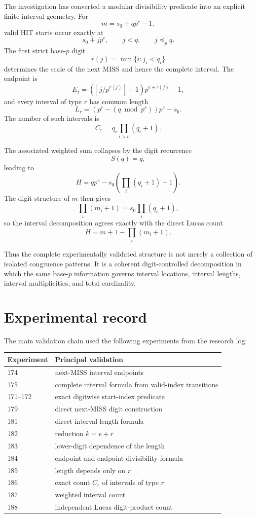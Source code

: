 \documentclass[11pt,a4paper]{article}
\theoremstyle{definition}
\theoremstyle{remark}
\newcommand{\floor}[1]{\left\lfloor #1\right\rfloor}
\begin{document}
The investigation has converted a modular divisibility predicate into an explicit finite interval geometry. For
\[
 m=s_0+qp^e-1,
\]
valid HIT starts occur exactly at
\[
 s_0+jp^e,
\qquad j<q,
\qquad j\preceq_p q.
\]
The first strict base-$p$ digit
\[
 r(j)=\min\{i:j_i<q_i\}
\]
determines the scale of the next MISS and hence the complete interval. The endpoint is
\[
 E_j=
 \left(\floor{j/p^{r(j)}}+1\right)p^{e+r(j)}-1,
\]
and every interval of type $r$ has common length
\[
 L_r=\left(p^r-(q\bmod p^r)\right)p^e-s_0.
\]
The number of such intervals is
\[
 C_r=q_r\prod_{i>r}(q_i+1).
\]

The associated weighted sum collapses by the digit recurrence
\[
 S(q)=q,
\]
leading to
\[
 H=qp^e-s_0\left(\prod_i(q_i+1)-1\right).
\]
The digit structure of $m$ then gives
\[
 \prod_i(m_i+1)=s_0\prod_i(q_i+1),
\]
so the interval decomposition agrees exactly with the direct Lucas count
\[
\boxed{H=m+1-\prod_i(m_i+1)}.
\]

Thus the complete experimentally validated structure is not merely a collection of isolated congruence patterns. It is a coherent digit-controlled decomposition in which the same base-$p$ information governs interval locations, interval lengths, interval multiplicities, and total cardinality.

\section{Experimental record}

The main validation chain used the following experiments from the research log:
\begin{center}
\begin{tabular}{@{}ll@{}}
\toprule
Experiment & Principal validation \\
\midrule
174 & next-MISS interval endpoints \\
175 & complete interval formula from valid-index transitions \\
171--172 & exact digitwise start-index predicate \\
179 & direct next-MISS digit construction \\
181 & direct interval-length formula \\
182 & reduction $k=e+r$ \\
183 & lower-digit dependence of the length \\
184 & endpoint and endpoint divisibility formula \\
185 & length depends only on $r$ \\
186 & exact count $C_r$ of intervals of type $r$ \\
187 & weighted interval count \\
188 & independent Lucas digit-product count \\
\bottomrule
\end{tabular}
\end{center}
\end{document}
